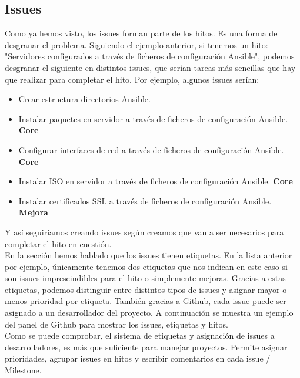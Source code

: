 \subsection{Issues}
\begin{text}
	Como ya hemos visto, los issues forman parte de los hitos. Es una forma de desgranar el problema. Siguiendo el ejemplo anterior, si tenemos un hito: "Servidores configurados a través de ficheros de configuración Ansible", podemos desgranar el siguiente en distintos issues, que serían tareas más sencillas que hay que realizar para completar el hito. Por ejemplo, algunos issues serían: 
	\begin{itemize}
		\item Crear estructura directorios Ansible.
		\item Instalar paquetes en servidor a través de ficheros de configuración Ansible. \textbf{Core}
		\item Configurar interfaces de red a través de ficheros de configuración Ansible. \textbf{Core}
		\item Instalar ISO en servidor a través de ficheros de configuración Ansible. \textbf{Core}
		\item Instalar certificados SSL a través de ficheros de configuración Ansible. \textbf{Mejora}
	\end{itemize}
	
	Y así seguiríamos creando issues según creamos que van a ser necesarios para completar el hito en cuestión. \\
	En la sección   hemos hablado que los issues tienen etiquetas. En la lista anterior por ejemplo, únicamente tenemos dos etiquetas que nos indican en este caso si son issues imprescindibles para el hito o simplemente mejoras. Gracias a estas etiquetas, podemos distinguir entre distintos tipos de issues y asignar mayor o menos prioridad por etiqueta. También gracias a Github, cada issue puede ser asignado a un desarrollador del proyecto. A continuación se muestra un ejemplo del panel de Github para mostrar los issues, etiquetas y hitos. \\
	Como se puede comprobar, el sistema de etiquetas y asignación de issues a desarrolladores, es más que suficiente para manejar proyectos. Permite asignar prioridades, agrupar issues en hitos y escribir comentarios en cada issue / Milestone. 
	

\end{text}
